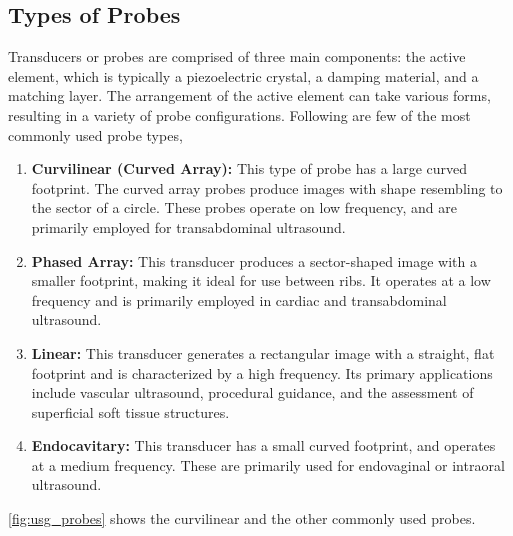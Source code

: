 \subsection{Types of Probes}
%
Transducers or probes are comprised of three main components: the active element, which is typically a piezoelectric crystal, a damping material, and a matching layer. The arrangement of the active element can take various forms, resulting in a variety of probe configurations. Following are few of the most commonly used probe types,
\begin{enumerate}
    \item \textbf{Curvilinear (Curved Array):} This type of probe has a large curved footprint. The curved array probes produce images with shape resembling to the sector of a circle. These probes operate on low frequency, and are primarily employed for transabdominal ultrasound. 
    \item \textbf{Phased Array:} This transducer produces a sector-shaped image with a smaller footprint, making it ideal for use between ribs. It operates at a low frequency and is primarily employed in cardiac and transabdominal ultrasound.
    \item \textbf{Linear:} This transducer generates a rectangular image with a straight, flat footprint and is characterized by a high frequency. Its primary applications include vascular ultrasound, procedural guidance, and the assessment of superficial soft tissue structures.
    \item \textbf{Endocavitary:} This transducer has a small curved footprint, and operates at a medium frequency. These are primarily used for endovaginal or intraoral ultrasound.
\end{enumerate}
\cref{fig:usg_probes} shows the curvilinear and the other commonly used probes.

